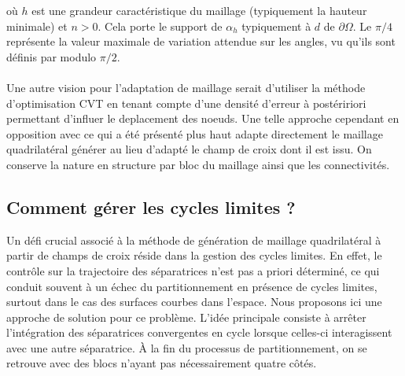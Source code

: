 où $h$ est une grandeur caractéristique du maillage (typiquement la hauteur minimale) et $n > 0$. Cela porte le support de $\alpha_h$ typiquement à $d$ de $\partial\Omega$. Le $\pi/4$ représente la valeur maximale de variation attendue sur les angles, vu qu’ils sont définis par modulo $\pi/2$.\\\\
Une autre vision pour l'adaptation de maillage serait d'utiliser la méthode d'optimisation CVT en tenant compte d'une densité d'erreur à postéririori permettant d'influer le deplacement des noeuds. Une telle approche cependant en opposition avec ce qui a été présenté plus haut adapte directement le maillage quadrilatéral générer au lieu d'adapté le champ de croix dont il est issu. On conserve la nature en structure par bloc du maillage ainsi que les connectivités.

\subsection*{Comment gérer les cycles limites ?}
Un défi crucial associé à la méthode de génération de maillage quadrilatéral à partir de champs de croix réside dans la gestion des cycles limites. En effet, le contrôle sur la trajectoire des séparatrices n'est pas a priori déterminé, ce qui conduit souvent à un échec du partitionnement en présence de cycles limites, surtout dans le cas des surfaces courbes dans l'espace. Nous proposons ici une approche de solution pour ce problème. L'idée principale consiste à arrêter l'intégration des séparatrices convergentes en cycle lorsque celles-ci interagissent avec une autre séparatrice. À la fin du processus de partitionnement, on se retrouve avec des blocs n'ayant pas nécessairement quatre côtés.

